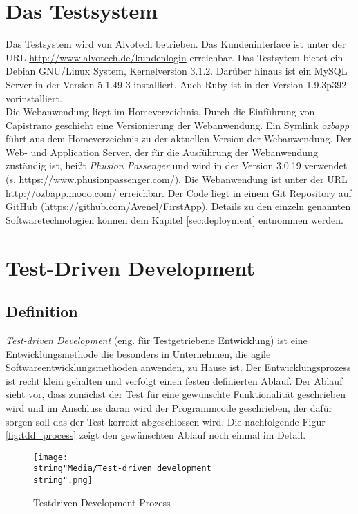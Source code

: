 \documentclass[12pt,             %
               a4paper,          %
               listof=totoc,     %
               index=totoc,      %
               bibliography=totoc,%
               oneside,         %
               BCOR1cm,          %
               english   %
               ]{scrbook}
\begin{document}
\section{Das Testsystem}\label{sec:Das_Testsystem}
Das Testsystem wird von Alvotech betrieben. Das Kundeninterface ist unter der URL \url{http://www.alvotech.de/kundenlogin} erreichbar. Das Testsytem bietet ein Debian GNU/Linux System, Kernelversion 3.1.2. Darüber hinaus ist ein MySQL Server in der Version 5.1.49-3 installiert. Auch Ruby ist in der Version 1.9.3p392 vorinstalliert.\\
Die Webanwendung liegt im Homeverzeichnis. Durch die Einführung von Capistrano geschieht eine Versionierung der Webanwendung. Ein Symlink \textit{ozbapp} führt aus dem Homeverzeichnis zu der aktuellen Version der Webanwendung. Der Web- und Application Server, der für die Ausführung der Webanwendung zuständig ist, heißt \textit{Phusion Passenger} und wird in der Version 3.0.19 verwendet (s. \url{https://www.phusionpassenger.com/}). Die Webanwendung ist unter der URL \url{http://ozbapp.mooo.com/} erreichbar. Der Code liegt in einem Git Repository auf GitHub (\url{https://github.com/Avenel/FirstApp}). Details zu den einzeln genannten Softwaretechnologien können dem Kapitel \ref{sec:deployment} entnommen werden.


\section{Test-Driven Development}
\subsection{Definition}
\textit{Test-driven Development} (eng. für \glqq Testgetriebene Entwicklung\grqq) ist eine Entwicklungsmethode die besonders in Unternehmen, die agile Softwareentwicklungsmethoden anwenden, zu Hause ist. Der Entwicklungsprozess ist recht klein gehalten und verfolgt einen festen definierten Ablauf. Der Ablauf sieht vor, dass zunächst der Test für eine gewünschte Funktionalität geschrieben wird und im Anschluss daran wird der Programmcode geschrieben, der dafür sorgen soll das der Test korrekt abgeschlossen wird. Die nachfolgende Figur \vref{fig:tdd_process} zeigt den gewünschten Ablauf noch einmal im Detail.

\begin{figure}[H]
     \begin{center}
          \texttt{[image: \\string"Media/Test-driven\_development\\string".png]}
     \end{center}
     \label{fig:tdd_process}
     \caption{Testdriven Development Prozess}
\end{figure} 
\end{document}
